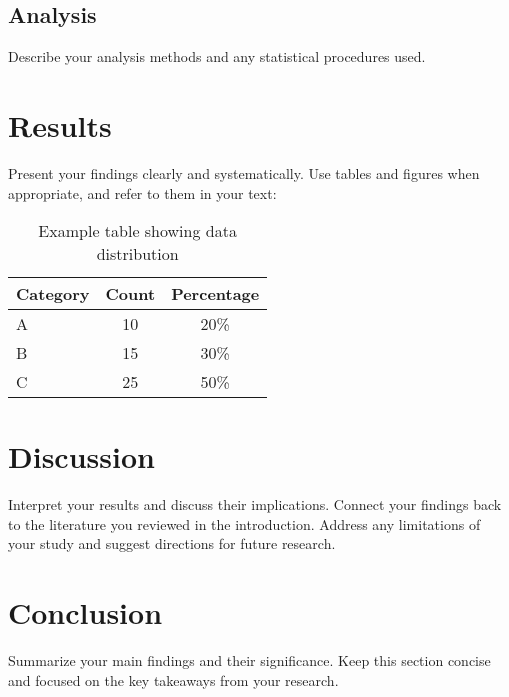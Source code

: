 \documentclass[12pt, titlepage]{article}
\begin{document}
  \subsection{Analysis}
    Describe your analysis methods and any statistical procedures used.

\section{Results}
  Present your findings clearly and systematically. Use tables and figures when 
  appropriate, and refer to them in your text:

  \begin{table}[ht]
    \centering
    \begin{tabular}{lcc}
      \hline
      Category & Count & Percentage \\
      \hline
      A & 10 & 20\% \\
      B & 15 & 30\% \\
      C & 25 & 50\% \\
      \hline
    \end{tabular}
    \caption{Example table showing data distribution}
    \label{tab:distribution}
  \end{table}

\section{Discussion}
  Interpret your results and discuss their implications. Connect your findings 
  back to the literature you reviewed in the introduction. Address any 
  limitations of your study and suggest directions for future research.

\section{Conclusion}
  Summarize your main findings and their significance. Keep this section concise 
  and focused on the key takeaways from your research.

\clearpage %
\singlespacing  %


\end{document}
